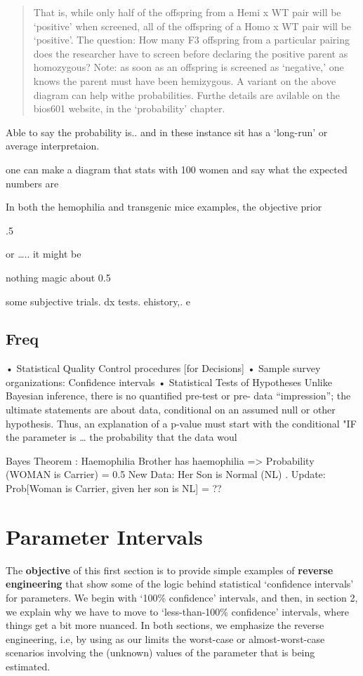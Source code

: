 \documentclass[]{book}
\begin{document}
\begin{quote}
That is, while only half of the offspring from a Hemi x WT pair will be `positive' when screened, all of the offspring of a Homo x WT pair will be `positive'.
The question: How many F3 offspring from a particular pairing does the researcher have to screen before declaring the positive parent as homozygous? Note: as soon as an offspring is screened as `negative,' one knows the parent must have been hemizygous. A variant on the above diagram can help withe probabilities. Furthe details are avilable on the bios601 website, in the `probability' chapter.
\end{quote}

Able to say the probability is.. and in these instance sit has a `long-run' or average interpretaion.

one can make a diagram that stats with 100 women and
say what the expected numbers are

In both the hemophilia and transgenic mice examples, the objective prior

.5

or \ldots{}.. it might be

nothing magic about 0.5

some subjective trials. dx tests. ehistory,. e

\hypertarget{freq}{%
\section{Freq}\label{freq}}

• Statistical Quality Control procedures {[}for Decisions{]} • Sample survey organizations: Confidence intervals • Statistical Tests of Hypotheses
Unlike Bayesian inference, there is no quantified pre-test or pre- data ``impression''; the ultimate statements are about data, conditional on an assumed null or other hypothesis.
Thus, an explanation of a p-value must start with the conditional "IF the parameter is \ldots{} the probability that the data woul

Bayes Theorem : Haemophilia
Brother has haemophilia =\textgreater{} Probability (WOMAN is Carrier) = 0.5 New Data: Her Son is Normal (NL) .
Update: Prob{[}Woman is Carrier, given her son is NL{]} = ??

\hypertarget{CI}{%
\chapter{Parameter Intervals}\label{CI}}

The \textbf{objective} of this first section is to provide simple examples of \textbf{reverse engineering} that show some of the logic behind statistical `confidence intervals' for parameters. We begin with `100\% confidence' intervals, and then, in section 2, we explain why we have to move to `less-than-100\% confidence' intervals, where things get a bit more nuanced.
In both sections, we emphasize the reverse engineering, i.e, by using as our limits the worst-case or almost-worst-case scenarios involving the (unknown) values of the parameter that is being estimated.
\end{document}
